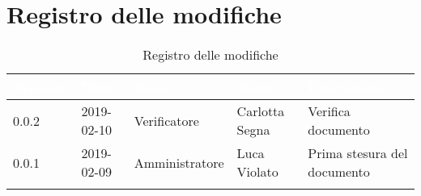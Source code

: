 \newpage

\section{Registro delle modifiche}

\begin{center}
\begin{longtable}[c]{|m{}|m{}|m{}|m{}|p{}|}
\hline
\rowcolor{bluelogo}\textbf{\textcolor{white}{Versione}} & \textbf{\textcolor{white}{Data}} & \textbf{\textcolor{white}{Ruolo}} & \textbf{\textcolor{white}{Autore}} & \textbf{\textcolor{white}{Descrizione}}\\
\hline \hline
\endfirsthead
\rowcolor{grigio} 0.0.2 & 2019-02-10 & Verificatore & Carlotta Segna & Verifica documento \\
\hline
0.0.1 & 2019-02-09 & Amministratore & Luca Violato & Prima stesura del documento\\
\hline
\caption{Registro delle modifiche}
\end{longtable}
\end{center}
